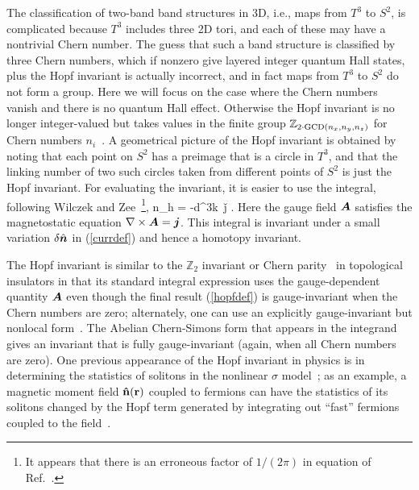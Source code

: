 \documentclass[prl,showpacs,superscriptaddress,twocolumn,preprintnumbers,amssymb,amsfonts]{revtex4}
\begin{document}
The classification of two-band band structures in 3D, i.e., maps from $T^3$ to $S^2$, is complicated because $T^3$ includes three 2D tori, and each of these may have a nontrivial Chern number.  The guess that such a band structure is classified by three Chern numbers, which if nonzero give layered integer quantum Hall states, plus the Hopf invariant is actually incorrect, and in fact maps from $T^3$ to $S^2$ do not form a group.  Here we will focus on the case where the Chern numbers vanish and there is no quantum Hall effect.  Otherwise the Hopf invariant is no longer integer-valued but takes values in the finite group $\mathbb{Z}_{2 \cdot {\rm GCD}(n_x,n_y,n_z)}$ for Chern numbers $n_i$~\cite{pontryagin,misirpashaev}.  A geometrical picture of the Hopf invariant is obtained by noting that each point on $S^2$ has a preimage that is a circle in $T^3$, and that the linking number of two such circles taken from different points of $S^2$ is just the Hopf invariant.  For evaluating the invariant, it is easier to use the integral, following Wilczek and Zee~\cite{wilczekzee}\footnote{It appears that there is an erroneous factor of $1/(2 \pi)$ in equation of Ref.~.},
\beq
n_h = -\int d^3k\, {\v j} .
\label{hopfdef}
\eeq
Here the gauge field ${\boldsymbol{A}}$ satisfies the magnetostatic equation $\nabla \times {\boldsymbol{A}} = {\boldsymbol{j}}$.  This integral is invariant under a small variation $\delta{\hat{\boldsymbol{n}}}$ in (\ref{currdef}) and hence a homotopy invariant.

The Hopf invariant is similar to the $\mathbb{Z}_2$ invariant or Chern parity~\cite{fu&kane1-2006,essinmoore} in topological insulators in that its standard integral expression uses the gauge-dependent quantity ${\boldsymbol{A}}$ even though the final result (\ref{hopfdef}) is gauge-invariant when the Chern numbers are zero; alternately, one can use an explicitly gauge-invariant but nonlocal form~\cite{jackiwrev}.  The Abelian Chern-Simons form that appears in the integrand gives an invariant that is fully gauge-invariant (again, when all Chern numbers are zero).  One previous appearance of the Hopf invariant in physics is in determining the statistics of solitons in the nonlinear $\sigma$ model~\cite{wilczekzee}; as an example, a magnetic moment field ${\bf \hat n}({\bf r})$ coupled to fermions can have the statistics of its solitons changed by the Hopf term generated by integrating out ``fast'' fermions coupled to the field~\cite{hsianglee}.
\end{document}
